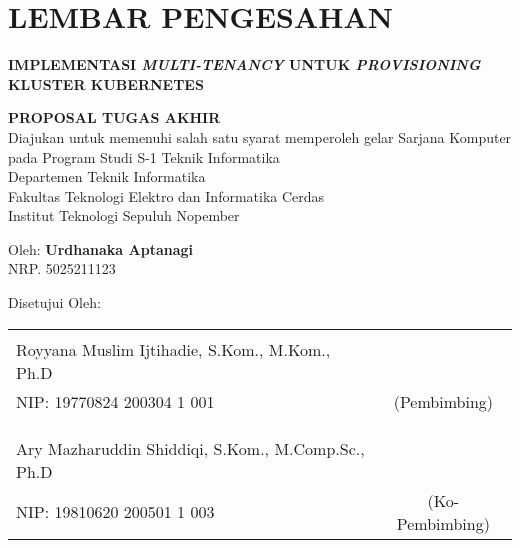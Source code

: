 \chapter*{LEMBAR PENGESAHAN}
\thispagestyle{empty}
\begin{center}
  \textbf{IMPLEMENTASI \emph{MULTI-TENANCY} UNTUK \emph{PROVISIONING} KLUSTER KUBERNETES}
\end{center}

\begingroup
\small

\begin{center}
  \textbf{PROPOSAL TUGAS AKHIR} \\
  Diajukan untuk memenuhi salah satu syarat memperoleh gelar
  Sarjana Komputer pada
  Program Studi S-1 Teknik Informatika \\
  Departemen Teknik Informatika \\
  Fakultas Teknologi Elektro dan Informatika Cerdas \\
  Institut Teknologi Sepuluh Nopember
\end{center}

\begin{center}
  Oleh: \textbf{Urdhanaka Aptanagi} \\
  NRP. 5025211123
\end{center}

\begin{center}
  Disetujui Oleh:
\end{center}

\vspace{10ex}

\begingroup
\setlength{\tabcolsep}{0pt}

\noindent
\begin{tabularx}{\textwidth}{X c}
        &                 \\
  Royyana Muslim Ijtihadie, S.Kom., M.Kom., Ph.D      &                 \\
  NIP: 19770824 200304 1 001                          & (Pembimbing)    \\
                                                      &                 \\
                                                      &                 \\
                                                      &                 \\
  Ary Mazharuddin Shiddiqi, S.Kom., M.Comp.Sc., Ph.D  &                 \\
  NIP: 19810620 200501 1 003                          & (Ko-Pembimbing) \\
\end{tabularx}
\endgroup

